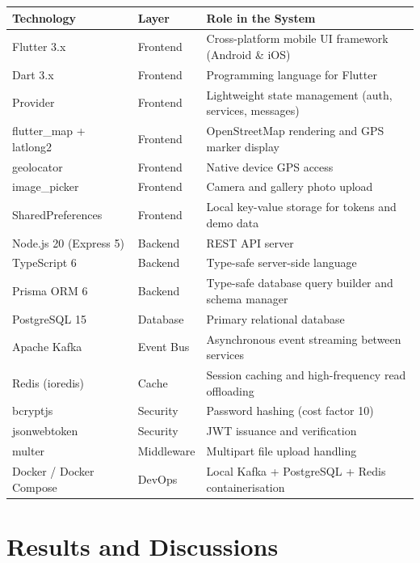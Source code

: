 \documentclass[12pt,a4paper]{report}
\begin{document}
\begin{longtable}{l l p{7cm}}
\toprule
\textbf{Technology} & \textbf{Layer} & \textbf{Role in the System} \\
\midrule
Flutter 3.x            & Frontend      & Cross-platform mobile UI framework (Android \& iOS) \\
Dart 3.x               & Frontend      & Programming language for Flutter \\
Provider               & Frontend      & Lightweight state management (auth, services, messages) \\
flutter\_map + latlong2 & Frontend     & OpenStreetMap rendering and GPS marker display \\
geolocator             & Frontend      & Native device GPS access \\
image\_picker          & Frontend      & Camera and gallery photo upload \\
SharedPreferences      & Frontend      & Local key-value storage for tokens and demo data \\
Node.js 20 (Express 5) & Backend       & REST API server \\
TypeScript 6           & Backend       & Type-safe server-side language \\
Prisma ORM 6           & Backend       & Type-safe database query builder and schema manager \\
PostgreSQL 15          & Database      & Primary relational database \\
Apache Kafka           & Event Bus     & Asynchronous event streaming between services \\
Redis (ioredis)        & Cache         & Session caching and high-frequency read offloading \\
bcryptjs               & Security      & Password hashing (cost factor 10) \\
jsonwebtoken           & Security      & JWT issuance and verification \\
multer                 & Middleware    & Multipart file upload handling \\
Docker / Docker Compose & DevOps       & Local Kafka + PostgreSQL + Redis containerisation \\
\bottomrule
\end{longtable}

\chapter{Results and Discussions}
\end{document}
